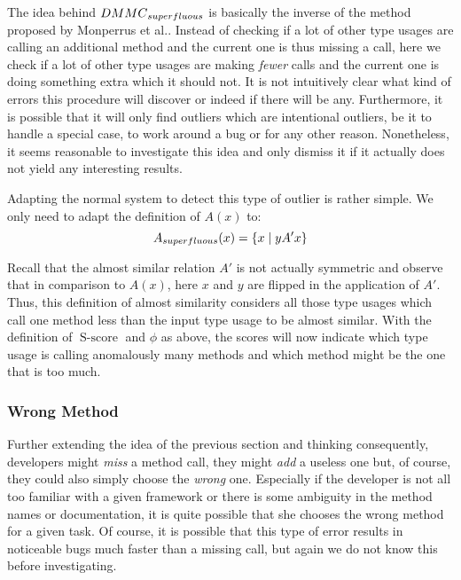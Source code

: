 The idea behind $\mathnormal{DMMC}_{\mathnormal{superfluous}}$ is basically the inverse of the method proposed by Monperrus et al..
Instead of checking if a lot of other type usages are calling an additional method and the current one is thus missing a call, here we check if a lot of other type usages are making \emph{fewer} calls and the current one is doing something extra which it should not.
It is not intuitively clear what kind of errors this procedure will discover or indeed if there will be any.
Furthermore, it is possible that it will only find outliers which are intentional outliers, be it to handle a special case, to work around a bug or for any other reason.
Nonetheless, it seems reasonable to investigate this idea and only dismiss it if it actually does not yield any interesting results.


Adapting the normal system to detect this type of outlier is rather simple.
We only need to adapt the definition of $A(x)$ to:
\begin{equation*}
    A_{\mathnormal{superfluous}}(x) = \{x \mid yA'x \}
\end{equation*}

Recall that the almost similar relation $A'$ is not actually symmetric and observe that in comparison to $A(x)$, here $x$ and $y$ are flipped in the application of $A'$. 
Thus, this definition of almost similarity considers all those type usages which call one method less than the input type usage to be almost similar.
With the definition of $\operatorname{S-score}$ and $\phi$ as above, the scores will now indicate which type usage is calling anomalously many methods and which method might be the one that is too much.

\subsubsection{Wrong Method}

Further extending the idea of the previous section and thinking consequently, developers might \emph{miss} a method call, they might \emph{add} a useless one but, of course, they could also simply choose the \emph{wrong} one.
Especially if the developer is not all too familiar with a given framework or there is some ambiguity in the method names or documentation, it is quite possible that she chooses the wrong method for a given task.
Of course, it is possible that this type of error results in noticeable bugs much faster than a missing call, but again we do not know this before investigating.

